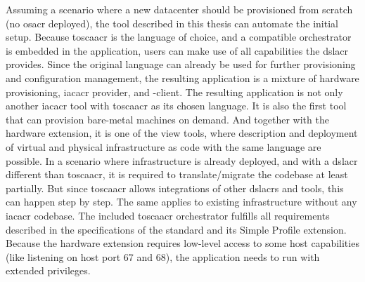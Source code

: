 Assuming a scenario where a new datacenter should be provisioned from scratch (no \gls{osacr} deployed), the tool described in this thesis can automate the initial setup. Because \gls{toscaacr} is the language of choice, and a compatible orchestrator is embedded in the application, users can make use of all capabilities the \gls{dslacr} provides. Since the original language can already be used for further provisioning and configuration management, the resulting application is a mixture of hardware provisioning, \gls{iacacr} provider, and -client.
\newline
The resulting application is not only another \gls{iacacr} tool with \gls{toscaacr} as its chosen language. It is also the first tool that can provision bare-metal machines on demand. And together with the hardware extension, it is one of the view tools, where description and deployment of virtual and physical infrastructure as code with the same language are possible.
\newline
In a scenario where infrastructure is already deployed, and with a \gls{dslacr} different than \gls{toscaacr}, it is required to translate/migrate the codebase at least partially. But since \gls{toscaacr} allows integrations of other \gls{dslacr}s and tools, this can happen step by step. The same applies to existing infrastructure without any \gls{iacacr} codebase.
\newline\smallskip
The included \gls{toscaacr} orchestrator fulfills all requirements described in the specifications of the standard and its Simple Profile extension. Because the hardware extension requires low-level access to some host capabilities (like listening on host port 67 and 68), the application needs to run with extended privileges.



